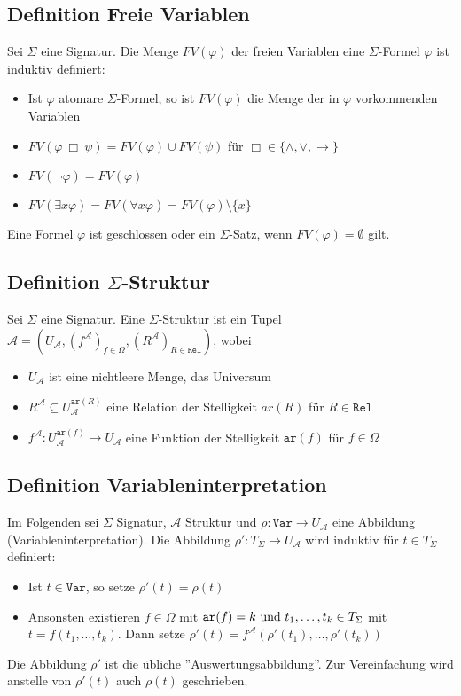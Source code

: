 \documentclass[12pt,a4paper]{report}
\newcommand{\ra}{\rightarrow}
\newcommand{\ls}{\newline\newline}
\newcommand{\red}[1]{\textcolor[rgb]{0.9,0.2,0.2}{#1}}
\newcommand{\blue}[1]{\textcolor[rgb]{0.2,0.2,1}{#1}}
\begin{document}
\subsection{\blue{Definition Freie Variablen}}
Sei $ \Sigma $ eine Signatur. Die Menge \red{$ FV(\varphi) $} der \red{freien Variablen} eine $ \Sigma $-Formel $ \varphi $ ist induktiv definiert:
\begin{itemize}
    \item Ist $ \varphi $ atomare $ \Sigma $-Formel, so ist $ FV(\varphi) $ die Menge der in $ \varphi $ vorkommenden Variablen
    \item $ FV(\varphi~\Box~ \psi) = FV(\varphi) \cup FV(\psi) $ für $ \Box \in \{\wedge, \vee, \ra\} $
    \item $ FV(\lnot \varphi) = FV(\varphi) $
    \item $ FV(\exists x \varphi) = FV(\forall x \varphi) = FV(\varphi)\setminus \{x\}  $
\end{itemize}
Eine Formel $ \varphi $ ist \red{geschlossen} oder ein \red{$ \Sigma $-Satz}, wenn $ FV(\varphi) = \emptyset $ gilt.

\subsection{\blue{Definition $ \Sigma $-Struktur}}
Sei $ \Sigma $ eine Signatur. Eine \red{$ \Sigma $-Struktur} ist ein Tupel $ \mathcal{A} = (U_\mathcal{A}, (f^\mathcal{A})_{f\in \Omega}, (R^\mathcal{A})_{R \in \texttt{Rel}}) $, wobei
\begin{itemize}
    \item $ U_\mathcal{A} $ ist eine nichtleere Menge, das \red{Universum}
    \item $ R^\mathcal{A} \subseteq U^{\texttt{ar}(R)}_\mathcal{A} $ eine Relation der Stelligkeit $ ar(R) $ für $ R \in \texttt{Rel} $
    \item $ f^\mathcal{A}: U^{\texttt{ar}(f)}_\mathcal{A} \ra U_\mathcal{A} $ eine Funktion der Stelligkeit $ \texttt{ar}(f) $ für $ f \in \Omega $
\end{itemize}

\subsection{\blue{Definition Variableninterpretation}}
Im Folgenden sei $ \Sigma $ Signatur, $ \mathcal{A} $ Struktur und $ \rho: \texttt{Var} \ra U_\mathcal{A} $ eine Abbildung \red{(Variableninterpretation)}.\ls
Die Abbildung \red{$ \rho': T_\Sigma \ra U_\mathcal{A} $} wird induktiv für $ t \in T_\Sigma $ definiert:
\begin{itemize}
    \item Ist $ t \in \texttt{Var} $, so setze $ \rho'(t) = \rho(t) $
    \item Ansonsten existieren $ f \in \Omega $ mit $ \texttt{ar}(f) = k \textnormal{ und } t_1,\dots,t_k \in T_\Sigma $ mit $ t = f(t_1,\dots,t_k) $. Dann setze $ \rho'(t) = f^\mathcal{A}(\rho'(t_1),\dots,\rho'(t_k)) $
\end{itemize}
Die Abbildung $ \rho' $ ist die übliche ''Auswertungsabbildung''. Zur Vereinfachung wird anstelle von $ \rho'(t) $ auch $ \rho(t) $ geschrieben.
\end{document}
